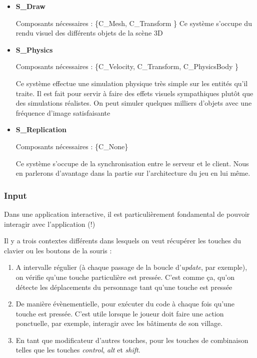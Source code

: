     \begin{itemize}
        \item \textbf{S\_Draw}
        
            Composants nécessaires : \{C\_Mesh, C\_Transform \}
            Ce système s'occupe du rendu visuel des différents objets de la scène 3D
        \item \textbf{S\_Physics}
        
            Composants nécessaires : \{C\_Velocity, C\_Transform, C\_PhysicsBody \}
            
            Ce système effectue une simulation physique très simple sur les entités qu'il traite. Il est fait pour servir à faire des effets visuels sympathiques plutôt que des simulations réalistes. On peut simuler quelques milliers d'objets avec une fréquence d'image satisfaisante
        \item \textbf{S\_Replication} 
        
            Composants nécessaires : \{C\_None\}
            
            Ce système s'occupe de la synchronisation entre le serveur et le client. Nous en parlerons d'avantage dans la partie sur l'architecture du jeu en lui même.
    \end{itemize}


\subsubsection{Input}
    Dans une application interactive, il est particulièrement fondamental de pouvoir interagir avec l'application  (!)

    Il y a trois contextes différents dans lesquels on veut récupérer les touches du clavier ou les boutons de la souris :
    \begin{enumerate}
        \item A intervalle régulier (à chaque passage de la boucle d'\textit{update}, par exemple), on vérifie qu'une touche particulière est pressée. C'est comme ça, qu'on détecte les déplacements du personnage tant qu'une touche est pressée

        \item De manière évènementielle, pour exécuter du code à chaque fois qu'une touche est pressée. C'est utile lorsque le joueur doit faire une action ponctuelle, par exemple, interagir avec les bâtiments de son village.

        \item En tant que modificateur d'autres touches, pour les touches de combinaison telles que les touches \textit{control}, \textit{alt} et \textit{shift}.
    \end{enumerate}


